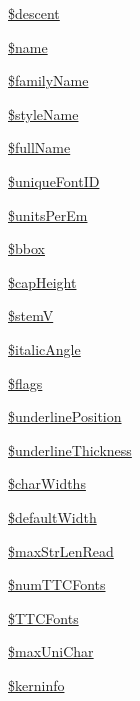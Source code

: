 \begin{DoxyCompactItemize}
\item 
\hyperlink{class_t_t_font_file_a5be94f69d8ae28c1a71cabbe18404853}{\$descent}
\item 
\hyperlink{class_t_t_font_file_a84e12a70d07814f6b0999ee9c195501b}{\$name}
\item 
\hyperlink{class_t_t_font_file_a4a1c8a2c37d346f1f3d1e19c1b2ee4a4}{\$family\-Name}
\item 
\hyperlink{class_t_t_font_file_a0b6dd13bc02d5dadac224bd023826085}{\$style\-Name}
\item 
\hyperlink{class_t_t_font_file_a077c70997ac180d3e509a24637318e4b}{\$full\-Name}
\item 
\hyperlink{class_t_t_font_file_a8b8adf6855223e67ac16a67f86c94d9c}{\$unique\-Font\-I\-D}
\item 
\hyperlink{class_t_t_font_file_ae3ecc7f8626da668176cccb7cefd6cd4}{\$units\-Per\-Em}
\item 
\hyperlink{class_t_t_font_file_a543eb40783bd593af58967394ae922f0}{\$bbox}
\item 
\hyperlink{class_t_t_font_file_ab1f71d2f16f00f89817b989398d13c2b}{\$cap\-Height}
\item 
\hyperlink{class_t_t_font_file_a60b6f66707aea0966e41eab3848b4de4}{\$stem\-V}
\item 
\hyperlink{class_t_t_font_file_a982c7559e516926a8735d8c2dc01976b}{\$italic\-Angle}
\item 
\hyperlink{class_t_t_font_file_af378d0526699871a8ea63f183a375030}{\$flags}
\item 
\hyperlink{class_t_t_font_file_a72bd51c23735e8079b1f1d41e33f6f9a}{\$underline\-Position}
\item 
\hyperlink{class_t_t_font_file_adc1902e34a647cbc3440f478b0598826}{\$underline\-Thickness}
\item 
\hyperlink{class_t_t_font_file_ac34aa61e131d41149069cd6a0c3abb63}{\$char\-Widths}
\item 
\hyperlink{class_t_t_font_file_a824f8f04ba134a24a13b024c93470bad}{\$default\-Width}
\item 
\hyperlink{class_t_t_font_file_a4fdd9e97b4e35f76777b99dd1e3044ad}{\$max\-Str\-Len\-Read}
\item 
\hyperlink{class_t_t_font_file_a4e1d77cee415df492659fee900ea4562}{\$num\-T\-T\-C\-Fonts}
\item 
\hyperlink{class_t_t_font_file_ae549803b45ff95b400456343c5454d3c}{\$\-T\-T\-C\-Fonts}
\item 
\hyperlink{class_t_t_font_file_a5dd59179fe1e63aec4bcdad449cf09f9}{\$max\-Uni\-Char}
\item 
\hyperlink{class_t_t_font_file_a30a9633378ea640cee5ddcd3ebff5cb4}{\$kerninfo}
\end{DoxyCompactItemize}


